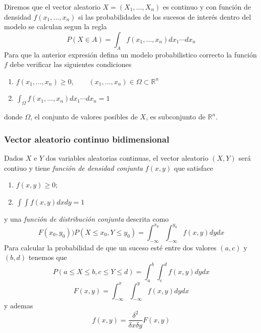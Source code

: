\documentclass{article}
\begin{document}
Diremos que el vector aleatorio \(X = (X_1, ..., X_n)\) es continuo y con 
función de densidad \(f(x_1, ..., x_n)\) si las probabilidades de los
sucesos de interés dentro del modelo se calculan segun la regla
\[P(X \in A) = \int_A f(x_1, ..., x_n)dx_1 \dotsi dx_n\]
Para que la anterior expresión defina un modelo probabilistico correcto
la función \(f\) debe verificar las siguientes condiciones
\begin{enumerate}
    \item \(f(x_1, ..., x_n) \geq 0, \qquad (x_1, ..., x_n) \in \Omega \subset \mathbb{R}^n\)
    \item \(\int_\Omega f(x_1, ..., x_n) dx_1 \dotsi dx_n = 1\)
\end{enumerate}
donde \(\Omega\), el conjunto de valores posibles de \(X\), es subconjunto
de \(\mathbb{R}^n\).
\subsubsection{Vector aleatorio continuo bidimensional}
Dados \(X\) e \(Y\) dos variables aleatorias continuas, el vector 
aleatorio \((X, Y)\) será contiuo y tiene \textit{función de densidad 
conjunta} \(f(x, y)\) que satisface
\begin{enumerate}
    \item \(f(x, y) \geq 0;\)
    \item \(\int\int f(x, y)dx dy = 1\)
\end{enumerate}
y una \textit{función de distribución conjunta} descrita como
\[F(x_0, y_0) ) P(X \leq x_0, Y \leq y_0) =  \int_{-\infty}^{x_0}\int_{-\infty}^{y_0} f(x, y)dy dx\]
Para calcular la probabilidad de que un suceso esté entre dos valores \((a, c)\) y \((b, d)\) tenemos que
\[P(a \leq X \leq b, c \leq Y \leq d) = \int_{a}^{b}\int_{c}^{d}f(x, y)dydx\]
\[F(x, y) = \int_{-\infty}^{x}\int_{-\infty}^{y} f(x, y)dydx\]
y ademas
\[f(x, y) = \frac{\delta^2}{\delta x\delta y}F(x, y)\]

\newpage
\end{document}
